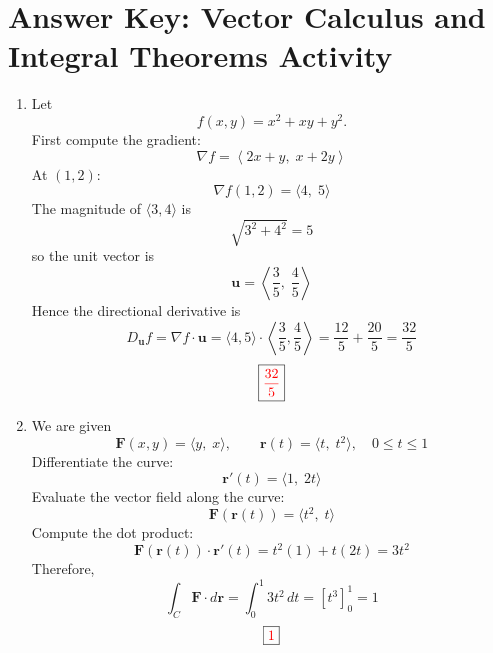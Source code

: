 \section*{Answer Key: Vector Calculus and Integral Theorems Activity}

\begin{enumerate}
    \item Let
          \[
              f(x,y)=x^2+xy+y^2.
          \]
          First compute the gradient:
          \[
              \nabla f=\left\langle 2x+y,\; x+2y\right\rangle
          \]
          At $(1,2)$:
          \[
              \nabla f(1,2)=\langle 4,\; 5\rangle
          \]
          The magnitude of $\langle 3,4\rangle$ is
          \[
              \sqrt{3^2+4^2}=5
          \]
          so the unit vector is
          \[
              \mathbf{u}=\left\langle \frac35,\; \frac45\right\rangle
          \]
          Hence the directional derivative is
          \[
              D_{\mathbf{u}}f=\nabla f\cdot \mathbf{u}
              =\langle 4,5\rangle\cdot \left\langle \frac35,\frac45\right\rangle
              =\frac{12}{5}+\frac{20}{5}
              =\frac{32}{5}
          \]
          \[
              \boxed{\textcolor{red}{\frac{32}{5}}}
          \]

    \item We are given
          \[
              \mathbf{F}(x,y)=\langle y,\; x\rangle,\qquad
              \mathbf{r}(t)=\langle t,\; t^2\rangle,\quad 0\le t\le 1
          \]
          Differentiate the curve:
          \[
              \mathbf{r}'(t)=\langle 1,\; 2t\rangle
          \]
          Evaluate the vector field along the curve:
          \[
              \mathbf{F}(\mathbf{r}(t))=\langle t^2,\; t\rangle
          \]
          Compute the dot product:
          \[
              \mathbf{F}(\mathbf{r}(t))\cdot \mathbf{r}'(t)=t^2(1)+t(2t)=3t^2
          \]
          Therefore,
          \[
              \int_C \mathbf{F}\cdot d\mathbf{r}
              =\int_0^1 3t^2\,dt
              =\left[t^3\right]_0^1
              =1
          \]
          \[
              \boxed{\textcolor{red}{1}}
          \]


\end{enumerate}
